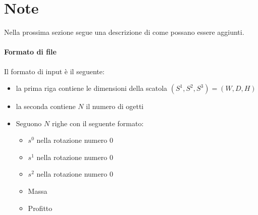 \documentclass{scrartcl}
\begin{document}
\section{Note}

Nella prossima sezione segue una descrizione di come possano essere aggiunti.
\paragraph{Formato di file}
Il formato di input è il seguente:
\begin{itemize}
	\item la prima riga contiene le dimensioni della scatola $(S^1, S^2, S^3) = (W, D, H)$
	\item la seconda contiene $N$ il numero di ogetti
	\item Seguono $N$ righe con il seguente formato:
	\begin{itemize}
		\item $s^0$ nella rotazione numero $0$
		\item $s^1$ nella rotazione numero $0$
		\item $s^2$ nella rotazione numero $0$
		\item Massa
		\item Profitto
	\end{itemize}
\end{itemize}
\end{document}

